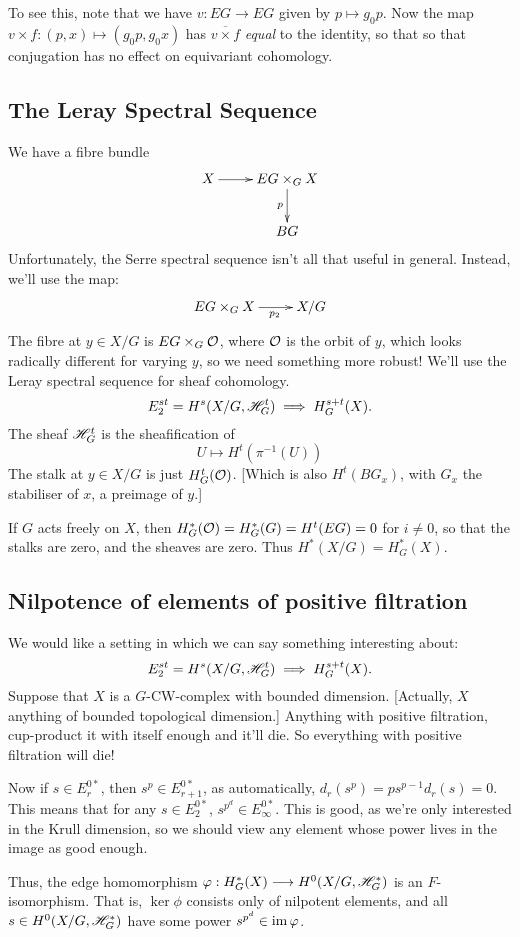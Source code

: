 \documentclass[11pt]{article}
\begin{document}
\begin{JeremyQuillen}
To see this, note that we have $v:EG\to EG$ given by $p\mapsto g_0p$. Now the map $v\times f:(p,x)\mapsto(g_0p,g_0x)$ has $\overline{v\times f}$ \emph{equal} to the identity, so that so that conjugation has no effect on equivariant cohomology.
\subsection*{The Leray Spectral Sequence}
We have a fibre bundle
\[\xymatrix{
X\ar[r]&EG\times_G X\ar[d]_p\\
&BG
}\]
Unfortunately, the Serre spectral sequence isn't all that useful in general. Instead, we'll use the map:
\[\xymatrix{
EG\times_G X\ar[r]_{\ \ \ p_2}&X/G
}\]
The fibre at $y\in X/G$ is $EG\times_G\mathcal{O}$, where $\mathcal{O}$ is the orbit of $y$, which looks radically different for varying $y$, so we need something more robust! We'll use the Leray spectral sequence for sheaf cohomology.
\[E_2^{st}=H^s(X/G,\mathscr{H}_G^t)\implies H_G^{s+t}(X).\]
The sheaf $\mathscr{H}_G^t$ is the sheafification of
\[U\mapsto H^t(\pi^{-1}(U))\]
The stalk at $y\in X/G$ is just $H^t_G(\mathcal{O})$. [Which is also $H^t(BG_x)$, with $G_x$ the stabiliser of $x$, a preimage of $y$.]
\begin{exmp*}
If $G$ acts freely on $X$, then $H_G^*(\mathcal{O})=H_G^*(G)=H^t(EG)=0$ for $i\neq0$, so that the stalks are zero, and the sheaves are zero. Thus $H^*(X/G)=H_G^*(X)$.
\end{exmp*}
\subsection*{Nilpotence of elements of positive filtration}
We would like a setting in which we can say something interesting about:
\[E_2^{st}=H^s(X/G,\mathscr{H}_G^t)\implies H_G^{s+t}(X).\]
Suppose that $X$ is a $G$-CW-complex with bounded dimension. [Actually, $X$ anything of bounded topological dimension.] Anything with positive filtration, cup-product it with itself enough and it'll die. So everything with positive filtration will die!

Now if $s\in E_r^{0*}$, then $s^p\in E_{r+1}^{0*}$, as automatically, $d_r(s^p)=ps^{p-1} d_r(s)=0$. This means that for any $s\in E_2^{0*}$, $s^{p^d}\in E_\infty^{0*}$. This is good, as we're only interested in the Krull dimension, so we should view any element whose power lives in the image as good enough.

Thus, the edge homomorphism $\varphi:H^*_G(X)\longrightarrow H^0(X/G,\mathscr{H}^*_G)$ is an $F$-isomorphism. That is, $\ker\phi$ consists only of nilpotent elements, and all $s\in H^0(X/G,\mathscr{H}^*_G)$ have some power $s^{p^d}\in\operatorname{im}\varphi$.


\end{JeremyQuillen}
\end{document}
